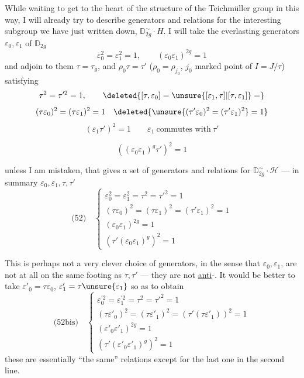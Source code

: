 
While waiting to get to the heart of the structure of the Teichmüller group in this way, I will already try to describe generators and relations for the interesting subgroup we have just written down, $\mathbb D_{2g}^{\sim}\cdot H$.
I will take the everlasting generators $\varepsilon_0,\varepsilon_1$ of $\mathbb D_{2g}$
\[
\varepsilon_0^2=\varepsilon_1^2=1,\qquad (\varepsilon_0\varepsilon_1)^{2g}=1
\]
and adjoin to them $\tau=\tau_g$, and  $\rho_0\tau=\tau'$
($\rho_0=\rho_{j_0}$, $j_0$ marked point of $I=J/\tau$)
satisfying
\[
\tau^2=\tau'^2=1,\qquad
\deleted{[\tau,\varepsilon_0]=\unsure{[\varepsilon_1,\tau]|[\tau,\varepsilon_1]}=}
\]
\[
(\tau\varepsilon_0)^2=(\tau\varepsilon_1)^2=1\quad
\deleted{\unsure{(\tau'\varepsilon_0)^2=(\tau'\varepsilon_1)^2}=1}
\]
\[
(\varepsilon_1\tau')^2=1
\qquad \varepsilon_1\ \text{commutes with}\ \tau'
\]





\[
((\varepsilon_0\varepsilon_1)^g\tau')^2=1
\]

unless I am mistaken, that gives a set of generators and relations for $\mathbb D_{2g}^{\sim}\cdot\mathcal H$ --- in summary $\varepsilon_0,\varepsilon_1,\tau,\tau'$
\[
\text{(52)}\quad
\left\{
\begin{array}{l}
\varepsilon_0^2=\varepsilon_1^2=\tau^2=\tau'^2=1\\
(\tau\varepsilon_0)^2=(\tau\varepsilon_1)^2=(\tau'\varepsilon_1)^2=1\\
(\varepsilon_0\varepsilon_1)^{2g}=1\\
(\tau'(\varepsilon_0\varepsilon_1)^g)^2=1
\end{array}
\right.
\]

This is perhaps not a very clever choice of generators, in the sense that $\varepsilon_0,\varepsilon_1$, are not at all on the same footing as $\tau,\tau'$ --- they are not \uline{anti}-. It would be better to take $\varepsilon'_0=\tau\varepsilon_0$, $\varepsilon'_1=\tau\unsure{\varepsilon_1}$ so as to obtain
\[
\text{(52bis)}\quad
\left\{
\begin{array}{l}
\varepsilon_0^{\prime 2}=\varepsilon_1^{\prime 2}=\tau^2=\tau'^2=1\\
(\tau\varepsilon'_0)^2=(\tau\varepsilon'_1)^2=(\tau'(\tau\varepsilon'_1))^2=1\\
(\varepsilon'_0\varepsilon'_1)^{2g}=1\\
(\tau'(\varepsilon'_0\varepsilon'_1)^g)^2=1
\end{array}
\right.
\]
these are essentially ``the same'' relations except for the last one in the second line.


